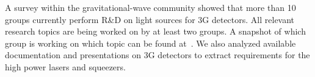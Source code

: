 

A survey within the gravitational-wave community showed that more than 10 groups currently perform R\&D on light sources for 3G detectors. All relevant research topics are being worked on by at least two groups. A snapshot of which group is working on which topic can be found at~\cite{LightSource_RD_table}. We also analyzed available documentation and presentations on 3G detectors to extract requirements for the high power lasers and squeezers.


